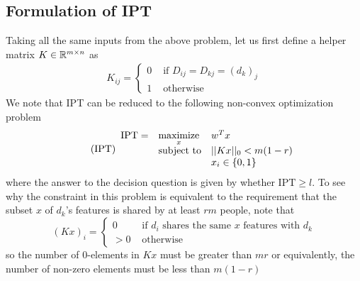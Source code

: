 \documentclass[12pt]{article}
\newcommand{\priv}{\text{IPT}}
\begin{document}
\subsection{Formulation of \gls{IPT}}
Taking all the same inputs from the above problem, let us first define a helper matrix $K \in \mathbb{R}^{m\times n}$ as
\begin{align*}
    K_{ij} = \begin{cases}
        0 & \text{ if } D_{ij} = D_{kj} = (d_k)_j\\
        1 & \text{ otherwise}
    \end{cases}
\end{align*} 
We note that \gls{IPT} can be reduced to the following non-convex optimization problem
\begin{equation}
	\label{eq:priv} 
    \tag{$\priv$} 
	\begin{array}{lll}
		\priv = & \underset{x}{\text{maximize}} & w^T x \\
		& \mbox{subject to} & ||K x||_{0}  < m(1-r) \\
        && x_i \in \{0,1\}
		\end{array}
\end{equation}
where the answer to the decision question is given by whether $\priv \geq l$. To see why the constraint in this problem is equivalent to the requirement that the subset $x$ of $d_k$'s features is shared by at least $rm$ people, note that  \[(Kx)_i = \begin{cases}
    0 & \text{ if } d_i \text{ shares the same } x \text{ features with } d_k \\
    > 0 & \text{ otherwise}
\end{cases}
\]
so the number of 0-elements in $Kx$ must be greater than $mr$ or equivalently, the number of non-zero elements must be less than $m(1-r)$ 
\end{document}
